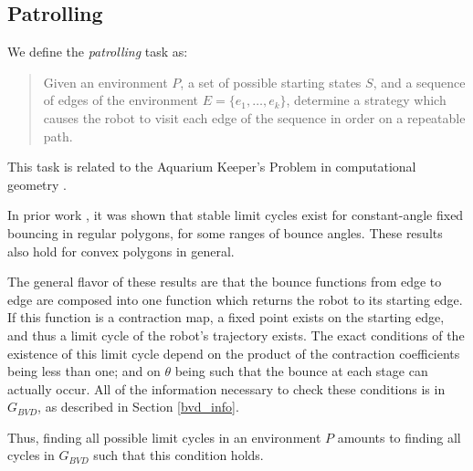 \documentclass[]{styles/svproc}  %
\begin{document}
\subsection{Patrolling \label{patrol}}

We define the \emph{patrolling} task as:

\begin{quotation}
Given an environment $P$, a set of possible starting states $S$, and
a sequence of edges of the environment $E = \{e_1, \ldots, e_k\}$,
determine a strategy which causes the robot to visit each edge of the sequence
in order on a repeatable path.
\end{quotation}

This task is related to the Aquarium Keeper's Problem in computational
geometry \cite{czyzowicz1991aquarium}.

In prior work \cite{NilBecLav17}, it was shown that stable limit cycles
exist for constant-angle fixed bouncing in regular polygons, for some ranges of bounce angles.
These results also hold for convex polygons in general.

The general flavor of these results are that the bounce functions from edge to
edge are composed into one function which returns the robot to its starting
edge. If this function is a contraction map, a fixed point exists on the
starting edge, and thus a limit cycle of the robot's trajectory exists. The
exact conditions of the existence of this limit cycle depend on the product of
the contraction coefficients being less than one; and on $\theta$ being such
that the bounce at each stage can actually occur. All of the information
necessary to check these conditions is in $G_{BVD}$, as described in Section
\ref{bvd_info}.

Thus, finding all possible limit cycles in an environment $P$ amounts to finding
all cycles in $G_{BVD}$ such that this condition holds.
\end{document}
